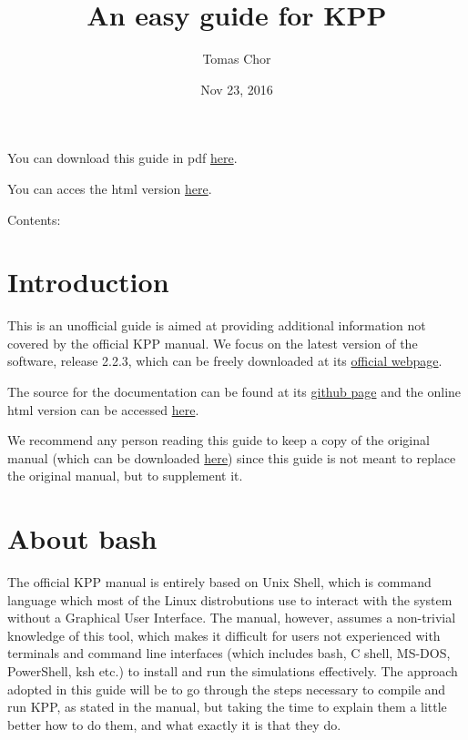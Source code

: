 \documentclass[letterpaper,10pt,openany,oneside]{sphinxmanual}
\title{An easy guide for KPP}
\date{Nov 23, 2016}
\author{Tomas Chor}
\begin{document}
\maketitle
\tableofcontents
{}\label{index::doc}


You can download this guide in pdf
\href{https://github.com/tomchor/ezkpp/raw/gh-pages/ezkpp.pdf}{here}.

You can acces the html version \href{https://tomchor.github.io/ezkpp/}{here}.

Contents:


\chapter{Introduction}
\label{README:introduction}\label{README:easy-guide-to-compiling-and-running-kpp}\label{README::doc}
This is an unofficial guide is aimed at providing additional information not
covered by the official KPP manual. We focus on the latest version of the
software, release 2.2.3, which can be freely downloaded at its \href{http://people.cs.vt.edu/~asandu/Software/Kpp/}{official
webpage}.

The source for the documentation can be found at its \href{https://github.com/tomchor/ezkpp}{github page} and the online html version can be
accessed \href{https://tomchor.github.io/ezkpp/}{here}.

We recommend any person reading this guide to keep a copy of the original
manual (which can be downloaded \href{http://people.cs.vt.edu/~asandu/Software/Kpp/}{here}) since this guide is not
meant to replace the original manual, but to supplement it.


\chapter{About bash}
\label{bash:about-bash}\label{bash::doc}
The official KPP manual is entirely based on Unix Shell, which is command
language which most of the Linux distrobutions use to interact with the system
without a Graphical User Interface. The manual, however, assumes a non-trivial
knowledge of this tool, which makes it difficult for users not experienced with
terminals and command line interfaces (which includes bash, C shell, MS-DOS,
PowerShell, ksh etc.) to install and run the simulations effectively. The
approach adopted in this guide will be to go through the steps necessary to
compile and run KPP, as stated in the manual, but taking the time to explain
them a little better how to do them, and what exactly it is that they do.
\end{document}
